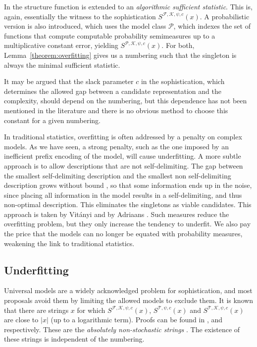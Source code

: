 \documentclass{style/llncs}
\newcommand{\T}{\mathscr T}
\newcommand{\F}{\mathscr F}
\newcommand{\K}{\mathscr K}
\begin{document}
In \cite{gacs2001algorithmic} the structure function is extended to an \emph{algorithmic sufficient statistic}. This is, again, essentially the witness to the sophistication $S^{\F,\K,\psi,c}(x)$. A probabilistic version is also introduced, which uses the model class $\mathcal P$, which indexes the set of functions that compute computable probability semimeasures up to a multiplicative constant error, yielding $S^{{\mathcal P}, \K, \psi, c}(x)$. For both, Lemma~\ref{theorem:overfitting} gives us a numbering such that the singleton is always the minimal sufficient statistic.

It may be argued that the slack parameter $c$ in the sophistication, which determines the allowed gap between a candidate representation and the complexity, should depend on the numbering, but this dependence has not been mentioned in the literature and there is no obvious method to choose this constant for a given numbering. 

In traditional statistics, overfitting is often addressed by a penalty on complex models. As we have seen, a strong penalty, such as the one imposed by an inefficient prefix encoding of the model, will cause underfitting. A more subtle approach is to allow descriptions that are not self-delimiting. The gap between the smallest self-delimiting description and the smallest non self-delimiting description grows without bound 
\cite[Section~4.5.5]{li1993introduction}, so that some information ends up in the noise, since placing all information in the model results in a self-delimiting, and thus non-optimal description. This eliminates the singletons as viable candidates. This approach is taken by Vit\'anyi \cite{vitanyi2004meaningful} and by Adriaans \cite{adriaans2012facticity}. Such measures reduce the overfitting problem, but they only increase the tendency to underfit. We also pay the price that the models can no longer be equated with probability measures, weakening the link to traditional statistics.

\subsection{Underfitting}
\label{section:underfitting}

Universal models are a widely acknowledged problem for sophistication, and most proposals avoid them by limiting the allowed models to exclude them. It is known that there are strings $x$ for which $S^{\F, \K, \psi, c}(x)$, $S^{\T, \psi, c}(x)$ and $S^{\T, \K, \psi, c}(x)$ are close to $|x|$ (up to a logarithmic term). Proofs can be found in \cite{gacs2001algorithmic}, \cite{antunes2009sophistication} and \cite{vitanyi2004meaningful} respectively. These are the \emph{absolutely non-stochastic strings} \cite{shen1983concept}. The existence of these strings is independent of the numbering. 
\end{document}
